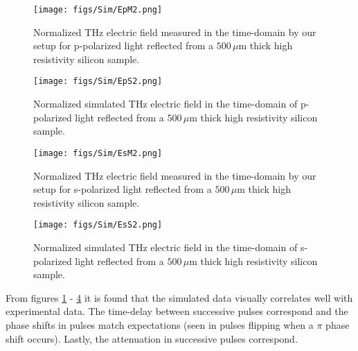 \begin{figure}[H]
\begin{center}
\texttt{[image: figs/Sim/EpM2.png]}
\end{center}
\caption{\label{fig:EpM} Normalized THz electric field measured in the time-domain by our setup for p-polarized light reflected from a $500\,\mu$m thick high resistivity silicon sample.}
\end{figure}

\begin{figure}[H]
\begin{center}
\texttt{[image: figs/Sim/EpS2.png]}
\end{center}
\caption{\label{fig:EpS} Normalized simulated THz electric field in the time-domain of p-polarized light reflected from a $500\,\mu$m thick high resistivity silicon sample.}
\end{figure}

\begin{figure}[H]
\begin{center}
\texttt{[image: figs/Sim/EsM2.png]}
\end{center}
\caption{\label{fig:EsM} Normalized THz electric field measured in the time-domain by our setup for s-polarized light reflected from a $500\,\mu$m thick high resistivity silicon sample.}
\end{figure}

\begin{figure}[H]
\begin{center}
\texttt{[image: figs/Sim/EsS2.png]}
\end{center}
\caption{\label{fig:EsS} Normalized simulated THz electric field in the time-domain of s-polarized light reflected from a $500\,\mu$m thick high resistivity silicon sample.}
\end{figure}

From figures \ref{fig:EpM} - \ref{fig:EsS} it is found that the simulated data visually correlates well with experimental data. The time-delay between successive pulses correspond and the phase shifts in pulses match expectations (seen in pulses flipping when a $\pi$ phase shift occurs). Lastly, the attenuation in successive pulses correspond.
\endinput